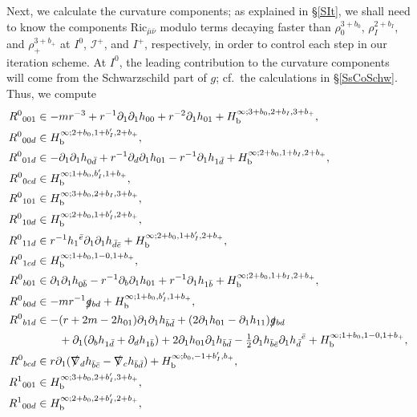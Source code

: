 \documentclass[reqno,11pt,letterpaper]{amsart}
\numberwithin{equation}{section}
\numberwithin{figure}{section}
\theoremstyle{definition}
\theoremstyle{remark}
\newcommand{\ms}{\mathscr}
\newcommand{\scri}{\ms I}
\newcommand{\slg}{\slashed{g}{}}
\newcommand{\slnabla}{\slashed{\nabla}{}}
\newcommand{\pa}{\partial}
\newcommand{\bop}{{\mathrm{b}}}
\newcommand{\half}{\tfrac{1}{2}}
\newcommand{\Hb}{H_{\bop}}
\newcommand{\Ric}{\mathrm{Ric}}
\begin{document}
Next, we calculate the curvature components; as explained in \S\ref{SIt}, we shall need to know the components $\Ric_{\bar\mu\bar\nu}$ modulo terms decaying faster than $\rho_0^{3+b_0}$, $\rho_I^{2+b_I}$, and $\rho_+^{3+b_+}$ at $I^0$, $\scri^+$, and $I^+$, respectively, in order to control each step in our iteration scheme. At $I^0$, the leading contribution to the curvature components will come from the Schwarzschild part of $g$; cf.\ the calculations in \S\ref{SsCoSchw}. Thus, we compute
\begin{align}
\label{EqCoPertRiem}
  R^0{}_{0 0 1} &\in -m r^{-3} + r^{-1}\pa_1\pa_1 h_{0 0}+r^{-2}\pa_1 h_{0 1} + \Hb^{\infty;3+b_0,2+b_I,3+b_+}, \\
  R^0{}_{0 0 d} &\in \Hb^{\infty;2+b_0,1+b'_I,2+b_+}, \nonumber\\
  R^0{}_{0 1 d} &\in -\pa_1\pa_1 h_{0\bar d}+r^{-1}\pa_d\pa_1 h_{0 1}-r^{-1}\pa_1 h_{1\bar d} + \Hb^{\infty;2+b_0,1+b_I,2+b_+}, \nonumber\\
  R^0{}_{0 c d} &\in \Hb^{\infty;1+b_0,b'_I,1+b_+}, \nonumber\\
  R^0{}_{1 0 1} &\in \Hb^{\infty;3+b_0,2+b_I,3+b_+}, \nonumber\\
  R^0{}_{1 0 d} &\in \Hb^{\infty;2+b_0,1+b'_I,2+b_+}, \nonumber\\
  R^0{}_{1 1 d} &\in r^{-1}h_1{}^{\bar e}\pa_1\pa_1 h_{\bar d\bar e} + \Hb^{\infty;2+b_0,1+b'_I,2+b_+}, \nonumber\\
  R^0{}_{1 c d} &\in \Hb^{\infty;1+b_0,1-0,1+b_+}, \nonumber\\
  R^0{}_{b 0 1} &\in \pa_1\pa_1 h_{0\bar b}-r^{-1}\pa_b\pa_1 h_{0 1}+r^{-1}\pa_1 h_{1\bar b} + \Hb^{\infty;2+b_0,1+b_I,2+b_+}, \nonumber\\
  R^0{}_{b 0 d} &\in -m r^{-1}\slg_{b d} + \Hb^{\infty;1+b_0,b'_I,1+b_+}, \nonumber\\
  R^0{}_{b 1 d} &\in -(r+2 m-2 h_{0 1})\pa_1\pa_1 h_{\bar b\bar d} + (2\pa_1 h_{0 1}-\pa_1 h_{1 1})\slg_{b d} \nonumber\\
    &\qquad + \pa_1(\pa_b h_{1\bar d}+\pa_d h_{1\bar b}) + 2\pa_1 h_{0 1}\pa_1 h_{\bar b\bar d} - \half\pa_1 h_{\bar b\bar e}\pa_1 h_{\bar d}{}^{\bar e} + \Hb^{\infty;1+b_0,1-0,1+b_+}, \nonumber\\
  R^0{}_{b c d} &\in r\pa_1(\slnabla_d h_{\bar b\bar c}-\slnabla_c h_{\bar b\bar d}) + \Hb^{\infty;b_0,-1+b'_I,b_+}, \nonumber\\
  R^1{}_{0 0 1} &\in \Hb^{\infty;3+b_0,2+b'_I,3+b_+}, \nonumber\\
  R^1{}_{0 0 d} &\in \Hb^{\infty;2+b_0,2+b'_I,2+b_+}, \nonumber\\

\end{align}
\end{document}

